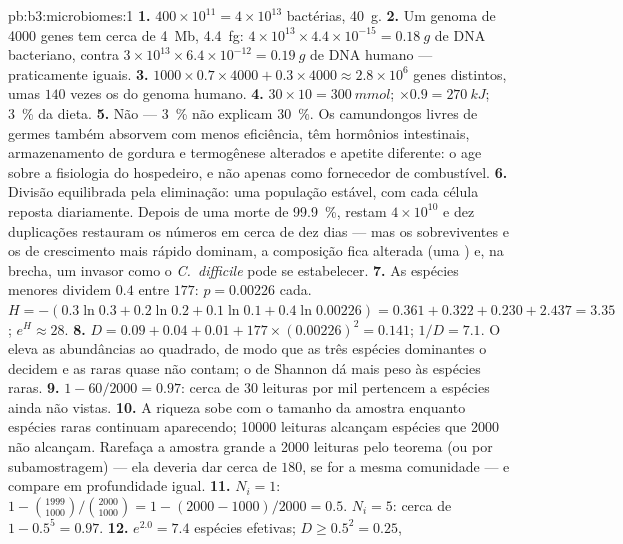 \begin{solution}{pb:b3:microbiomes:1}
\textbf{1.} $400\times 10^{11} = 4\times 10^{13}$ bactérias,
\qty{40}{g}.
\textbf{2.} Um genoma de \num{4000} genes tem cerca de \qty{4}{Mb},
\qty{4.4}{fg}: $4\times 10^{13}\times 4.4\times 10^{-15} = \qty{0.18}{g}$ de DNA bacteriano, contra $3\times 10^{13}\times 6.4\times 10^{-12} = \qty{0.19}{g}$ de DNA humano --- praticamente
iguais.
\textbf{3.} $1000\times 0.7\times 4000 + 0.3\times 4000 \approx 2.8\times
10^{6}$ genes distintos, umas $140$ vezes os do genoma humano.
\textbf{4.} $30\times 10 = \qty{300}{mmol}$; $\times 0.9 = \qty{270}{kJ}$;
\qty{3}{\%} da dieta.
\textbf{5.} Não --- \qty{3}{\%} não explicam \qty{30}{\%}. Os
camundongos livres de germes também absorvem com menos eficiência, têm
hormônios intestinais, armazenamento de gordura e termogênese alterados
e apetite diferente: o  age sobre a fisiologia do hospedeiro,
e não apenas como fornecedor de combustível.
\textbf{6.} Divisão equilibrada pela eliminação: uma população estável,
com cada célula reposta diariamente. Depois de uma morte de
\qty{99.9}{\%}, restam $4\times 10^{10}$ e dez duplicações restauram os
números em cerca de dez dias --- mas os sobreviventes e os de
crescimento mais rápido dominam, a composição fica alterada (uma
) e, na brecha, um invasor como o \emph{C.~difficile} pode se
estabelecer.
\textbf{7.} As espécies menores dividem $0.4$ entre $177$: $p = 0.00226$
cada. $H
= -(0.3\ln 0.3 + 0.2\ln 0.2 + 0.1\ln 0.1 + 0.4\ln 0.00226) = 0.361 +
0.322 + 0.230 + 2.437 = 3.35$; $e^{H} \approx 28$.
\textbf{8.} $D = 0.09 + 0.04 + 0.01 + 177\times (0.00226)^{2} = 0.141$;
$1/D = 7.1$. O  eleva as abundâncias ao quadrado, de
modo que as três espécies dominantes o decidem e as raras quase não
contam; o de Shannon dá mais peso às espécies raras.
\textbf{9.} $1 - 60/2000 = 0.97$: cerca de $30$ leituras por mil
pertencem a espécies ainda não vistas.
\textbf{10.} A riqueza sobe com o tamanho da amostra enquanto espécies
raras continuam aparecendo; \num{10000} leituras alcançam espécies que
\num{2000} não alcançam. Rarefaça a amostra grande a \num{2000}
leituras pelo teorema (ou por subamostragem) --- ela deveria dar cerca
de $180$, se for a mesma comunidade --- e compare em profundidade
igual.
\textbf{11.} $N_{i} = 1$: $1 - \binom{1999}{1000}/\binom{2000}{1000} =
1 - (2000 - 1000)/2000 = 0.5$. $N_{i} = 5$: cerca de
$1 - 0.5^{5} = 0.97$.
\textbf{12.} $e^{2.0} = 7.4$ espécies efetivas; $D \ge 0.5^{2} = 0.25$,

\end{solution}
